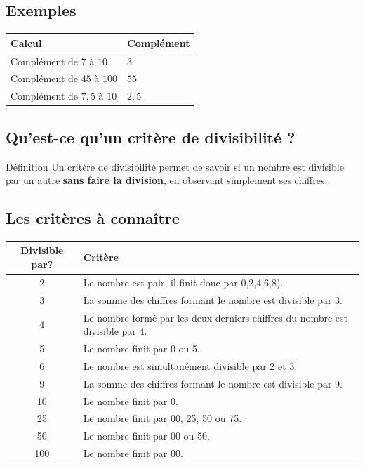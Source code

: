 \subsection{Exemples}

\def\arraystretch{1.1}
\begin{tabularx}{\linewidth}{|X|X|}
\hline
\cellcolor{themeNO!30}\textbf{Calcul} & \cellcolor{themeNO!30}\textbf{Complément} \\\hline
Complément de $7$ à $10$ & $3$ \\\hline
Complément de $45$ à $100$ & $55$ \\\hline
Complément de $7,5$ à $10$ & $2,5$ \\\hline
\end{tabularx}
\def\arraystretch{1}


\newpage
\semaineinvisible
{} 

\vfill
\subsection{Qu'est-ce qu'un critère de divisibilité ?}

\begin{regle}{Définition}
Un critère de divisibilité permet de savoir si un nombre est divisible par un autre \textbf{sans faire la division}, en observant simplement ses chiffres.
\end{regle}

\vspace{10pt}
\subsection{Les critères à connaître}

\def\arraystretch{1.6}
\begin{tabularx}{\linewidth}{|c|X|}
\hline
Divisible par?&Critère\\\hline
2&Le nombre est pair, il finit donc par 0,2,4,6,8).\\\hline
3&La somme des chiffres formant le nombre est divisible par 3.\\\hline
4&Le nombre formé par les deux derniers chiffres du nombre est divisible par 4.\\\hline
5&Le nombre finit par 0 ou 5.\\\hline
6&Le nombre est simultanément divisible par 2 et 3.\\\hline
9&La somme des chiffres formant le nombre est divisible par 9.\\\hline
10&Le nombre finit par 0.\\\hline
25&Le nombre finit par 00, 25, 50 ou 75.\\\hline
50&Le nombre finit par 00 ou 50.\\\hline
100&Le nombre finit par 00.\\\hline
\end{tabularx}
\def\arraystretch{1}

